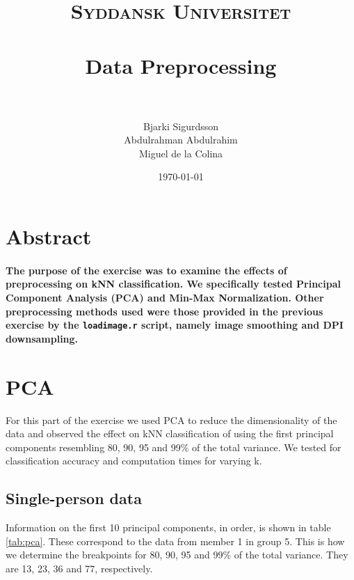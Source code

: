 \documentclass[paper=a4, fontsize=11pt]{scrartcl} %
\title{	
\normalfont \normalsize 
\textsc{Syddansk Universitet} \\ [25pt] 
\horrule{0.5pt} \\[0.4cm] %
\huge Data Preprocessing \\ %
\horrule{2pt} \\[0.5cm] %
}
\author{Bjarki Sigurdsson \\ Abdulrahman Abdulrahim \\ Miguel de la Colina}
\date{\normalsize\today} %
\begin{document}
\maketitle %



\section*{Abstract}

\paragraph{The purpose of the exercise was to examine the effects of preprocessing on kNN classification. We specifically tested Principal Component Analysis (PCA) and Min-Max Normalization. Other preprocessing methods used were those provided in the previous exercise by the \texttt{loadimage.r} script, namely image smoothing and DPI downsampling.}




\section{PCA}
For this part of the exercise we used PCA to reduce the dimensionality of the data and observed the effect on kNN classification of using the first principal components resembling 80, 90, 95 and 99\% of the total variance. We tested for classification accuracy and computation times for varying k.\par%
\subsection{Single-person data}
Information on the first 10 principal components, in order, is shown in table \ref{tab:pca}. These correspond to the data from member 1 in group 5. This is how we determine the breakpoints for 80, 90, 95 and 99\% of the total variance. They are 13, 23, 36 and 77, respectively. \par
\end{document}
